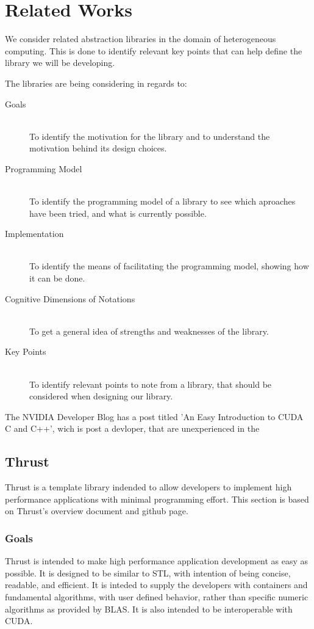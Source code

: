 \section{Related Works}
We consider related abstraction libraries in the domain of heterogeneous computing. This is done to identify relevant key points that can help define the library we will be developing.

The libraries are being considering in regards to:
\begin{description}
\item[Goals] \hfill \\
To identify the motivation for the library and to understand the motivation behind its design choices.
\item[Programming Model] \hfill \\
To identify the programming model of a library to see which aproaches have been tried, and what is currently possible.
\item[Implementation] \hfill \\
To identify the means of facilitating the programming model, showing how it can be done.
\item[Cognitive Dimensions of Notations] \hfill \\
To get a general idea of strengths and weaknesses of the library.
\item[Key Points] \hfill \\
To identify relevant points to note from a library, that should be considered when designing our library.
\end{description}

The NVIDIA Developer Blog has a post titled 'An Easy Introduction to CUDA C and C++', wich is post a devloper, that are unexperienced in the 
 
\subsection{Thrust}
Thrust is a template library indended to allow developers to implement high performance applications with minimal programming effort. This section is based on Thrust's overview document\cite{thrustOverview} and github page\cite{thrustGithub}.

\subsubsection{Goals}
Thrust is intended to make high performance application development as easy as possible. It is designed to be similar to STL, with intention of being concise, readable, and efficient. It is inteded to supply the developers with containers and fundamental algorithms, with user defined behavior, rather than specific numeric algorithms as provided by BLAS. It is also intended to be interoperable with CUDA.

